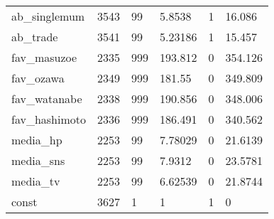 \begin{tabular}{llllll}
ab\_singlemum  &  3543 &         99 &    5.8538 &        1 &    16.086 \\
ab\_trade      &  3541 &         99 &   5.23186 &        1 &    15.457 \\
fav\_masuzoe   &  2335 &        999 &   193.812 &        0 &   354.126 \\
fav\_ozawa     &  2349 &        999 &    181.55 &        0 &   349.809 \\
fav\_watanabe  &  2338 &        999 &   190.856 &        0 &   348.006 \\
fav\_hashimoto &  2336 &        999 &   186.491 &        0 &   340.562 \\
media\_hp      &  2253 &         99 &   7.78029 &        0 &   21.6139 \\
media\_sns     &  2253 &         99 &    7.9312 &        0 &   23.5781 \\
media\_tv      &  2253 &         99 &   6.62539 &        0 &   21.8744 \\
const         &  3627 &          1 &         1 &        1 &         0 \\
\bottomrule
\end{tabular}
